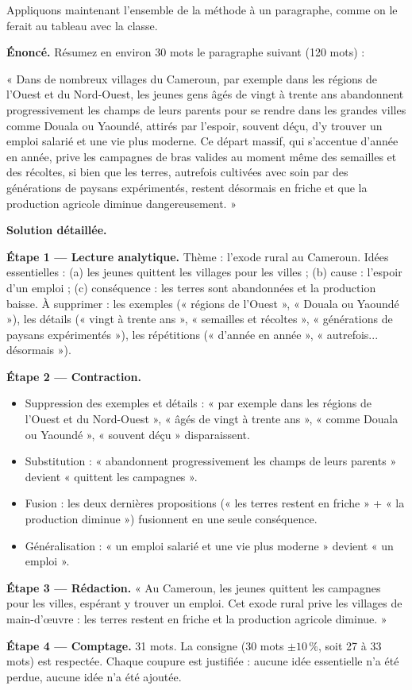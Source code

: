 \documentclass[11pt]{article}
\begin{document}
Appliquons maintenant l'ensemble de la méthode à un paragraphe, comme on le ferait au tableau avec la classe.

\begin{exoresolu}
\textbf{Énoncé.} Résumez en environ 30 mots le paragraphe suivant (120 mots) :

« Dans de nombreux villages du Cameroun, par exemple dans les régions de l'Ouest et du Nord-Ouest, les jeunes gens âgés de vingt à trente ans abandonnent progressivement les champs de leurs parents pour se rendre dans les grandes villes comme Douala ou Yaoundé, attirés par l'espoir, souvent déçu, d'y trouver un emploi salarié et une vie plus moderne. Ce départ massif, qui s'accentue d'année en année, prive les campagnes de bras valides au moment même des semailles et des récoltes, si bien que les terres, autrefois cultivées avec soin par des générations de paysans expérimentés, restent désormais en friche et que la production agricole diminue dangereusement. »

\tcblower
\textbf{Solution détaillée.}

\textbf{Étape 1 — Lecture analytique.} Thème : l'exode rural au Cameroun. Idées essentielles : (a) les jeunes quittent les villages pour les villes ; (b) cause : l'espoir d'un emploi ; (c) conséquence : les terres sont abandonnées et la production baisse. À supprimer : les exemples (« régions de l'Ouest », « Douala ou Yaoundé »), les détails (« vingt à trente ans », « semailles et récoltes », « générations de paysans expérimentés »), les répétitions (« d'année en année », « autrefois... désormais »).

\textbf{Étape 2 — Contraction.}
\begin{itemize}
\item Suppression des exemples et détails : « par exemple dans les régions de l'Ouest et du Nord-Ouest », « âgés de vingt à trente ans », « comme Douala ou Yaoundé », « souvent déçu » disparaissent.
\item Substitution : « abandonnent progressivement les champs de leurs parents » devient « quittent les campagnes ».
\item Fusion : les deux dernières propositions (« les terres restent en friche » + « la production diminue ») fusionnent en une seule conséquence.
\item Généralisation : « un emploi salarié et une vie plus moderne » devient « un emploi ».
\end{itemize}

\textbf{Étape 3 — Rédaction.} « Au Cameroun, les jeunes quittent les campagnes pour les villes, espérant y trouver un emploi. Cet exode rural prive les villages de main-d'œuvre : les terres restent en friche et la production agricole diminue. »

\textbf{Étape 4 — Comptage.} 31 mots. La consigne (30 mots $\pm 10\,\%$, soit 27 à 33 mots) est respectée. Chaque coupure est justifiée : aucune idée essentielle n'a été perdue, aucune idée n'a été ajoutée.
\end{exoresolu}
\end{document}
